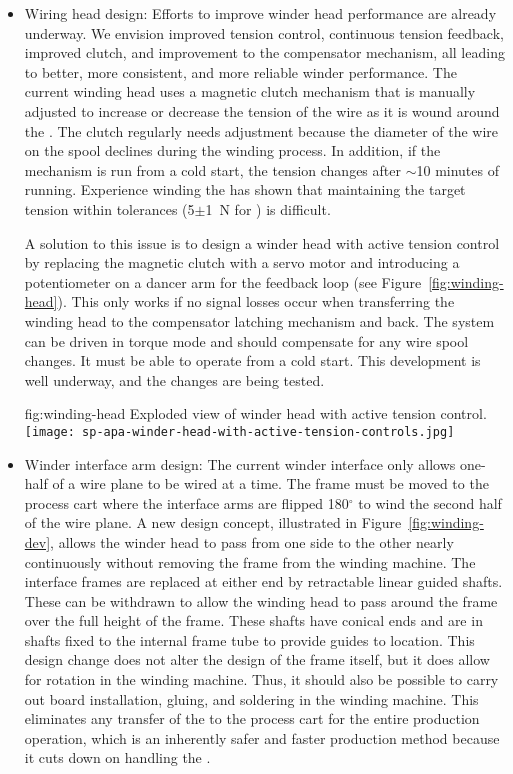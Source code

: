 \begin{itemize}

\item Wiring head design: Efforts to improve winder head performance are already underway. We envision improved tension control, continuous tension feedback, improved clutch, and improvement to the compensator mechanism, all leading to better, more consistent, and more reliable winder performance.  The current winding head uses a magnetic clutch mechanism that is manually adjusted to increase or decrease the tension of the wire as it is wound around the . The clutch regularly needs adjustment because the diameter of the wire on the spool declines during the winding process. In addition, if the mechanism is run from a cold start, the tension changes after $\sim$10 minutes of running. Experience winding the   has shown that maintaining the target tension within tolerances (5$\pm$\SI{1}{N} for ) is difficult.

A solution to this issue is to design a winder head with active tension control by replacing the magnetic clutch with a servo motor and introducing a potentiometer on a dancer arm for the feedback loop (see Figure~\ref{fig:winding-head}). This only works if no signal losses occur when transferring the winding head to the compensator latching mechanism and back. The system can be driven in torque mode and should compensate for any wire spool changes. It must be able to operate from a cold start. This development is well underway, and the changes are being tested.

\begin{dunefigure}{fig:winding-head}
{Exploded view of winder head with active tension control.}
\texttt{[image: sp-apa-winder-head-with-active-tension-controls.jpg]}
\end{dunefigure}

\item Winder interface arm design: The current winder interface only allows one-half of a wire plane to be wired at a time. The  frame must be moved to the process cart where the interface arms are flipped 180$^\circ$ to wind the second half of the wire plane.  A new design concept, illustrated in Figure~\ref{fig:winding-dev}, allows the winder head to pass from one side to the other nearly continuously without removing the frame from the winding machine.  The interface frames are replaced at either end by retractable linear guided shafts. These can be withdrawn to allow the winding head to pass around the frame over the full height of the frame. These shafts have conical ends and are in shafts fixed to the internal frame tube to provide guides to location. This design change does not alter the design of the frame itself, but it does allow for rotation in the winding machine. Thus, it should also be possible to carry out board installation, gluing, and soldering in the winding machine. This eliminates any transfer of the  to the process cart for the entire production operation, which is an inherently safer and faster production method because it cuts down on handling the .


\end{itemize}
